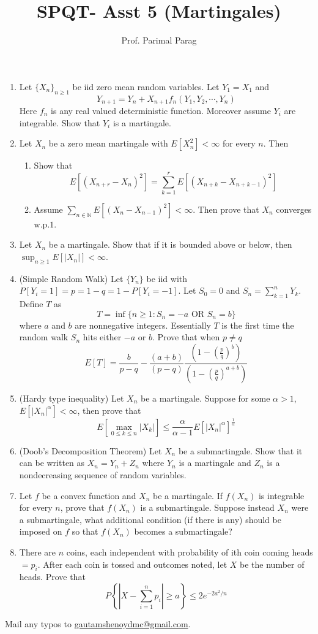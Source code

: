 \documentclass[a4paper,10pt]{article}
\title{SPQT- Asst 5 (Martingales)}
\author{Prof. Parimal Parag}
\begin{document}
\maketitle
\begin{enumerate}
	\item Let $\{X_n\}_{n \geq 1}$ be iid zero mean random variables. Let $Y_1 = X_1$ and
	\[Y_{n+1} = Y_n + X_{n+1}f_n(Y_1,Y_2,\cdots,Y_n)\]
	Here $f_n$ is any real valued deterministic function. Moreover assume $Y_i$ are integrable. Show that $Y_i$ is a martingale.
	
	\item Let $X_n$ be a zero mean martingale with $E[X_n^2] < \infty$ for every $n$. Then
	\begin{enumerate}
		\item Show that 
		\[E[(X_{n+r} -X_n)^2] = \sum_{k=1}^r E[(X_{n+k} - X_{n+k-1})^2] \]
		\item Assume $\sum_{n \in \mathbb{N}} E[(X_n -X_{n-1})^2] < \infty$. Then prove that $X_n$ converges w.p.$1$.
	\end{enumerate}
	
	\item Let $X_n$ be a martingale. Show that if it is bounded above or below, then $\sup_{n\geq 1} E[|X_n|] < \infty$.
	
	\item (Simple Random Walk) Let $\{Y_n\}$ be iid with $P[Y_i = 1] = p =1-q = 1-P[Y_i = -1]$. Let $S_0 = 0$ and $S_n = \sum_{k=1}^n Y_k$. Define $T$ as 
	\[T = \inf \{ n \geq 1: S_n = -a \mbox{ OR } S_n = b\}\]
	where $a$ and $b$ are nonnegative integers. Essentially $T$ is the first time the random walk $S_n$ hits either $-a$ or $b$. Prove that when $p \neq q$
	\[E[T] = \frac{b}{p-q} -\frac{(a+b)}{(p-q)}\frac{\left(1-(\frac{p}{q})^b\right)}{\left(1-(\frac{p}{q})^{a+b}\right)}\]
	
	\item (Hardy type inequality) Let $X_n$ be a martingale. Suppose for some $\alpha > 1$, $E[|X_n|^\alpha] < \infty$, then prove that
	\[E[\max_{0\leq k\leq n} |X_k|] \leq \frac{\alpha}{\alpha - 1} E[|X_n|^\alpha]^{\frac{1}{\alpha}}\]
	
	\item (Doob's Decomposition Theorem) Let $X_n$ be a submartingale. Show that it can be written as $X_n = Y_n + Z_n$ where $Y_n$ is a martingale and $Z_n$ is a nondecreasing sequence of random variables.
	
	\item Let $f$ be a convex function and $X_n$ be a martingale. If $f(X_n)$ is integrable for every $n$, prove that $f(X_n)$ is a submartingale. Suppose instead $X_n$ were a submartingale, what additional condition (if there is any) should be imposed on $f$ so that $f(X_n)$ becomes a submartingale?
	
	\item There are $n$ coins, each independent with probability of ith coin coming heads $= p_i$. After each coin is tossed and outcomes noted, let $X$ be the number of heads. Prove that
	\[P\left\{\left| X - \sum_{i=1}^np_i \right| \geq a\right\} \leq 2e^{-2a^2/n}\]
\end{enumerate}
Mail any typos to \url{gautamshenoydmc@gmail.com}.
\end{document}
